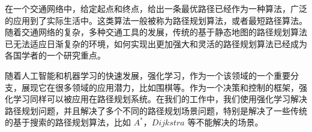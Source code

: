 \documentclass{standalone}
\begin{document}
	
\begin{chineseabstract}

在一个交通网络中，给定起点和终点，给出一条最优路径已经作为一种算法，广泛的应用到了实际生活中。这类算法一般被称为路径规划算法，或者最短路径算法。随着交通网络的复杂，多种交通工具的发展，传统的基于静态地图的路径规划算法已无法适应日渐复杂的环境，如何实现出更加强大和灵活的路径规划算法已经成为各国学者的一个研究重点。

随着人工智能和机器学习的快速发展，强化学习，作为一个该领域的一个重要分支，展现它在很多领域的应用潜力，比如围棋等。作为一个决策和控制的框架，强化学习同样可以被应用在路径规划系统。在我们的工作中，我们使用强化学习解决路径规划问题，并且解决了多个不同的路径规划场景问题，特别是解决了一些传统的基于搜索的路径规划算法，比如 $A^{*}$，$Dijkstra$ 等不能解决的场景。



\end{chineseabstract}
\end{document}
